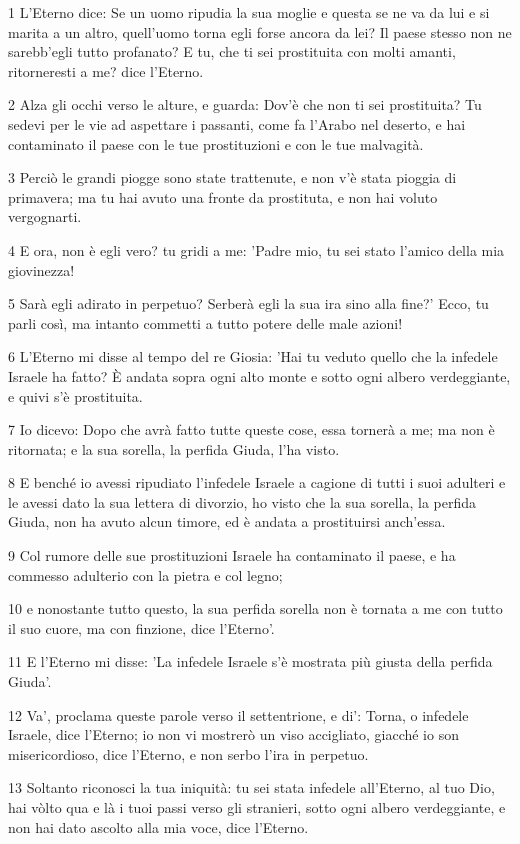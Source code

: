 \par 1 L'Eterno dice: Se un uomo ripudia la sua moglie e questa se ne va da lui e si marita a un altro, quell'uomo torna egli forse ancora da lei? Il paese stesso non ne sarebb'egli tutto profanato? E tu, che ti sei prostituita con molti amanti, ritorneresti a me? dice l'Eterno.
\par 2 Alza gli occhi verso le alture, e guarda: Dov'è che non ti sei prostituita? Tu sedevi per le vie ad aspettare i passanti, come fa l'Arabo nel deserto, e hai contaminato il paese con le tue prostituzioni e con le tue malvagità.
\par 3 Perciò le grandi piogge sono state trattenute, e non v'è stata pioggia di primavera; ma tu hai avuto una fronte da prostituta, e non hai voluto vergognarti.
\par 4 E ora, non è egli vero? tu gridi a me: 'Padre mio, tu sei stato l'amico della mia giovinezza!
\par 5 Sarà egli adirato in perpetuo? Serberà egli la sua ira sino alla fine?' Ecco, tu parli così, ma intanto commetti a tutto potere delle male azioni!
\par 6 L'Eterno mi disse al tempo del re Giosia: 'Hai tu veduto quello che la infedele Israele ha fatto? È andata sopra ogni alto monte e sotto ogni albero verdeggiante, e quivi s'è prostituita.
\par 7 Io dicevo: Dopo che avrà fatto tutte queste cose, essa tornerà a me; ma non è ritornata; e la sua sorella, la perfida Giuda, l'ha visto.
\par 8 E benché io avessi ripudiato l'infedele Israele a cagione di tutti i suoi adulteri e le avessi dato la sua lettera di divorzio, ho visto che la sua sorella, la perfida Giuda, non ha avuto alcun timore, ed è andata a prostituirsi anch'essa.
\par 9 Col rumore delle sue prostituzioni Israele ha contaminato il paese, e ha commesso adulterio con la pietra e col legno;
\par 10 e nonostante tutto questo, la sua perfida sorella non è tornata a me con tutto il suo cuore, ma con finzione, dice l'Eterno'.
\par 11 E l'Eterno mi disse: 'La infedele Israele s'è mostrata più giusta della perfida Giuda'.
\par 12 Va', proclama queste parole verso il settentrione, e di': Torna, o infedele Israele, dice l'Eterno; io non vi mostrerò un viso accigliato, giacché io son misericordioso, dice l'Eterno, e non serbo l'ira in perpetuo.
\par 13 Soltanto riconosci la tua iniquità: tu sei stata infedele all'Eterno, al tuo Dio, hai vòlto qua e là i tuoi passi verso gli stranieri, sotto ogni albero verdeggiante, e non hai dato ascolto alla mia voce, dice l'Eterno.
